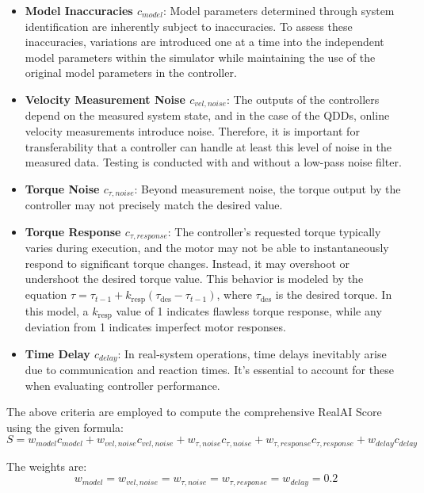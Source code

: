 \begin{itemize}
    \item \textbf{Model Inaccuracies \(c_{model}\)}: Model parameters determined through system identification are inherently subject to inaccuracies. To assess these inaccuracies, variations are introduced one at a time into the independent model parameters within the simulator while maintaining the use of the original model parameters in the controller.

    \item \textbf{Velocity Measurement Noise \(c_{vel, noise}\)}: The outputs of the controllers depend on the measured system state, and in the case of the QDDs, online velocity measurements introduce noise. Therefore, it is important for transferability that a controller can handle at least this level of noise in the measured data. Testing is conducted with and without a low-pass noise filter.
    
    \item \textbf{Torque Noise \(c_{\tau,noise}\)}: Beyond measurement noise, the torque output by the controller may not precisely match the desired value.

    \item \textbf{Torque Response \(c_{\tau,response}\)}: The controller's requested torque typically varies during execution, and the motor may not be able to instantaneously respond to significant torque changes. Instead, it may overshoot or undershoot the desired torque value. This behavior is modeled by the equation \(\tau = \tau_{t-1} + k_{\text{resp}} (\tau_{\text{des}} - \tau_{t-1})\), where \(\tau_{\text{des}}\) is the desired torque. In this model, a \(k_{\text{resp}}\) value of 1 indicates flawless torque response, while any deviation from 1 indicates imperfect motor responses.

    \item \textbf{Time Delay \(c_{delay}\)}: In real-system operations, time delays inevitably arise due to communication and reaction times. It's essential to account for these when evaluating controller performance.
\end{itemize}

The above criteria are employed to compute the comprehensive RealAI Score using the given formula:
\begin{equation}
 S = w_{model} c_{model} + 
    w_{vel, noise} c_{vel, noise} +  
    w_{\tau, noise} c_{\tau, noise} +  
    w_{\tau, response} c_{\tau, response} +  
    w_{delay} c_{delay}
\end{equation}

The weights are:
\begin{equation}
 w_{model} = w_{vel, noise} = w_{\tau, noise} = w_{\tau, response} = w_{delay} = 0.2
\end{equation}
\cleardoublepage
